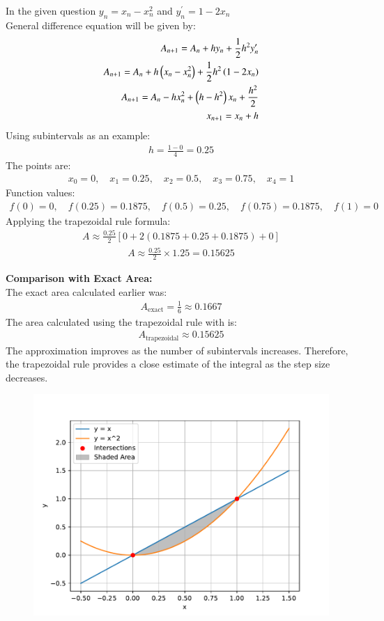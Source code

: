 \documentclass[journal]{IEEEtran}
\begin{document}
In the given question $y_n = x_n - x^2_n$ and $y^{\prime}_n = 1-2x_n$\\
General difference equation will be given by:
\begin{align}
    A_{n+1} = A_n + hy_n + \frac{1}{2}h^2y^{\prime}_n\\
    A_{n+1} = A_n + h\left(x_n - x^2_n\right) + \frac{1}{2}h^2\left(1-2x_n\right)\\
    A_{n+1} = A_n - hx^2_n + \left(h-h^2\right)x_n + \frac{h^2}{2}\\
    x_{n+1} = x_n + h
\end{align}
Using  subintervals as an example:
\begin{align}
    h = \frac{1 - 0}{4} = 0.25
\end{align}
The points are: 
\begin{align}
    x_0 = 0, \quad x_1 = 0.25, \quad x_2 = 0.5, \quad x_3 = 0.75, \quad x_4 = 1
\end{align}
Function values:
\begin{align}
    f(0) = 0, \quad f(0.25) = 0.1875, \quad f(0.5) = 0.25, \quad f(0.75) = 0.1875, \quad f(1) = 0
\end{align}
Applying the trapezoidal rule formula:
\begin{align}
    A \approx \frac{0.25}{2} \left[0 + 2(0.1875 + 0.25 + 0.1875) + 0\right]
\end{align}
\begin{align}
    A \approx \frac{0.25}{2} \times 1.25 = 0.15625
\end{align}

\textbf{Comparison with Exact Area:}\\
The exact area calculated earlier was:
\begin{align}
    A_{\text{exact}} = \frac{1}{6} \approx 0.1667
\end{align}
The area calculated using the trapezoidal rule with  is:
\begin{align}
    A_{\text{trapezoidal}} \approx 0.15625
\end{align}
The approximation improves as the number of subintervals increases. Therefore, the trapezoidal rule provides a close estimate of the integral as the step size decreases.
\begin{figure}[h!]
   \centering
   \includegraphics[width=\columnwidth]{figs/fig.pdf}
\end{figure}
\end{document}
